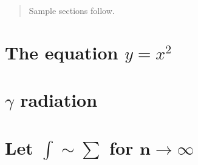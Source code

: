 \documentclass{article}
\begin{document}
\tableofcontents
{}
\begin{abstract}
\centering
Sample sections follow.
\end{abstract}
\section{The equation \texorpdfstring{$y=x^2$}{y=x\texttwosuperior}}
\section{\texorpdfstring{$\gamma$}{\textgamma} radiation}
\section[\texorpdfstring{Let $\int\sim\sum$ for $n\rightarrow\infty$}
                        {Let \int\sim\sum\ for n\rightarrow\infty}]
        {Let $\bm{\int\sim\sum}$ for $\bm{n\rightarrow\infty}$}
\end{document}
